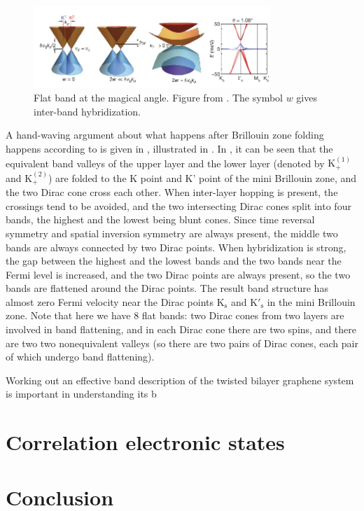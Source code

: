 \documentclass[hyperref, a4paper]{article}
\begin{document}
\begin{figure}
    \centering
    \includegraphics[width=0.8\textwidth]{plot/yuan-cao-band.pdf}
    \caption{Flat band at the magical angle. Figure from \cite{cao_correlated_2018}.
    The symbol $w$ gives inter-band hybridization.}
    \label{fig:flat-band-generation}
\end{figure}

A hand-waving argument about what happens after Brillouin zone folding happens according to 
is given in \cite{cao_correlated_2018},
illustrated in .
In , it can be seen that 
the equivalent band valleys of the upper layer and the lower layer 
(denoted by $\mathrm{K}^{(1)}_+$ and $\mathrm{K}^{(2)}_+$)
are folded to the K point and K' point of the mini Brillouin zone,
and the two Dirac cone cross each other.
When inter-layer hopping is present,
the crossings tend to be avoided,
and the two intersecting Dirac cones split into four bands,
the highest and the lowest being blunt cones.
Since time reversal symmetry and spatial inversion symmetry are always present,
the middle two bands are always connected by two Dirac points.
When hybridization is strong, the gap between the highest and the lowest bands 
and the two bands near the Fermi level is increased,
and the two Dirac points are always present,
so the two bands are flattened around the Dirac points.
The result band structure has almost zero Fermi velocity near the Dirac points 
$\mathrm{K}_{\text{s}}$  and $\mathrm{K}'_{\text{s}}$ in the mini Brillouin zone.
Note that here we have 8 flat bands:
two Dirac cones from two layers are involved in band flattening,
and in each Dirac cone there are two spins,
and there are two two nonequivalent valleys 
(so there are two pairs of Dirac cones, 
each pair of which undergo band flattening).

Working out an effective band description of the twisted bilayer graphene system 
is important in understanding its b

\section{Correlation electronic states}



\section{Conclusion}

\printbibliography
\end{document}
